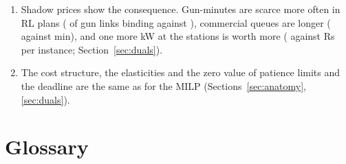 \begin{keybox}
\begin{enumerate}[leftmargin=1.4em,itemsep=1pt]
  \item Shadow prices show the consequence. Gun-minutes are scarce more often in RL plans (\GunBindR\pct{} of gun links binding against \GunBindM\pct), commercial queues are longer (\QueueRComm{} against \QueueMComm{} min), and one more kW at the stations is worth more (\PowerFR{} against \PowerFM{} Rs per instance; Section~\ref{sec:duals}).
  \item The cost structure, the elasticities and the zero value of patience limits and the deadline are the same as for the MILP (Sections~\ref{sec:anatomy}, \ref{sec:duals}).
\end{enumerate}
\end{keybox}

\newpage
\tableofcontents
\newpage

\section{Glossary}
\label{sec:glossary}

